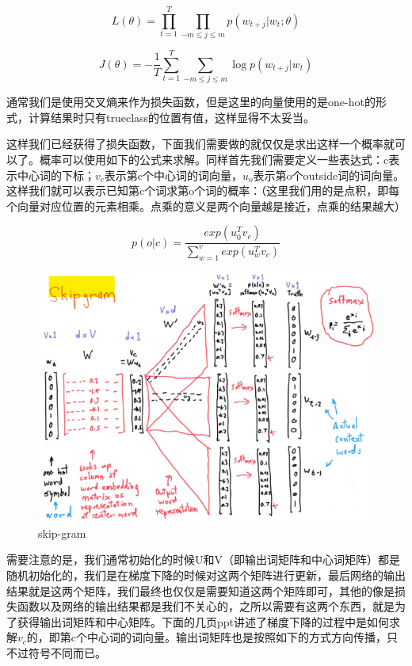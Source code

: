 	\begin{equation}
		L(\theta) = \prod_{t=1}^{T} \prod_{-m \leq j \leq m} p(w_{t+j}|w_t;\theta)
	\end{equation}
	
	\begin{equation}
		J(\theta) = -\frac{1}{T} \sum_{t=1}^{T} \sum_{-m \leq j \leq m} \log p(w_{t+j}|w_t)
	\end{equation}
	
	通常我们是使用交叉熵来作为损失函数，但是这里的向量使用的是one-hot的形式，计算结果时只有trueclass的位置有值，这样显得不太妥当。
	
	这样我们已经获得了损失函数，下面我们需要做的就仅仅是求出这样一个概率就可以了。概率可以使用如下的公式来求解。同样首先我们需要定义一些表达式：c表示中心词的下标；$v_c$表示第c个中心词的词向量，$u_o$表示第o个outside词的词向量。这样我们就可以表示已知第c个词求第o个词的概率：（这里我们用的是点积，即每个向量对应位置的元素相乘。点乘的意义是两个向量越是接近，点乘的结果越大）
	
	\begin{equation}
	p(o|c) = \frac{exp(u_0^T v_c)}{\sum_{w=1}^v exp(u_w^T v_c)}
	\end{equation}
	
	\begin{figure}[htbp]
	\centering\includegraphics[width=5.5in]{img/6-4.png}
	\caption{skip-gram}\label{fig:6-4}
	\end{figure}
	
	
	需要注意的是，我们通常初始化的时候U和V（即输出词矩阵和中心词矩阵）都是随机初始化的，我们是在梯度下降的时候对这两个矩阵进行更新，最后网络的输出结果就是这两个矩阵，我们最终也仅仅是需要知道这两个矩阵即可，其他的像是损失函数以及网络的输出结果都是我们不关心的，之所以需要有这两个东西，就是为了获得输出词矩阵和中心矩阵。下面的几页ppt讲述了梯度下降的过程中是如何求解$v_c$的，即第c个中心词的词向量。输出词矩阵也是按照如下的方式方向传播，只不过符号不同而已。
	

